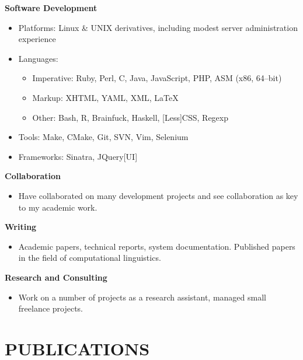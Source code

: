 \documentclass{res}
\begin{document}
\begin{resume}
   {\bf Software Development}
        \begin{itemize}
            \item[] Platforms: Linux \& UNIX derivatives, including modest server administration experience
            \item[] Languages:
                \begin{itemize}
                    \item Imperative: Ruby, Perl, C, Java, JavaScript, PHP, ASM (x86, 64--bit)
                    \item Markup: XHTML, YAML, XML, \LaTeX
                    \item Other: Bash, R, Brainfuck, Haskell, [Less]CSS, Regexp
                \end{itemize}
            \item[] Tools: Make, CMake, Git, SVN, Vim, Selenium
            \item[] Frameworks: Sinatra, JQuery[UI]
        \end{itemize}

  {\bf Collaboration}
    \begin{itemize}
      \item[] Have collaborated on many development projects and see collaboration as key to my academic work.
      \end{itemize}

  {\bf Writing}
    \begin{itemize} %
      \item[] Academic papers, technical reports, system documentation.
        Published papers in the field of computational linguistics.
      \end{itemize}


   {\bf  Research and Consulting}
    \begin{itemize}
        \item[] Work on a number of projects as a research assistant, managed small freelance projects.
    \end{itemize}


\section{PUBLICATIONS}
\vspace{0.1in}


%
%


\end{resume}
\end{document}
